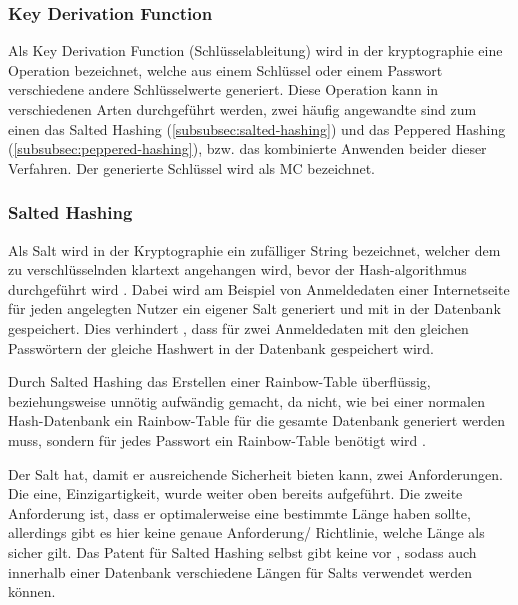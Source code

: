 \subsubsection{Key Derivation Function}\label{subsubsec:key-derivation-function}
Als Key Derivation Function (Schlüsselableitung) wird in der \gls{kryptographie} eine Operation bezeichnet, welche aus einem Schlüssel oder einem Passwort verschiedene andere Schlüsselwerte generiert.\autocite[\vglf][]{NIST:800132} Diese Operation kann in verschiedenen Arten durchgeführt werden, zwei häufig angewandte sind zum einen das Salted Hashing (\autoref{subsubsec:salted-hashing}) und das Peppered Hashing (\autoref{subsubsec:peppered-hashing}), bzw. das kombinierte Anwenden beider dieser Verfahren. Der generierte Schlüssel wird als \ac{MC} bezeichnet.


\subsubsection{Salted Hashing}\label{subsubsec:salted-hashing}
Als Salt wird in der Kryptographie ein zufälliger String bezeichnet, welcher dem zu verschlüsselnden \gls{klartext} angehangen wird, bevor der Hash-\gls{algorithmus} durchgeführt wird \autocite[\vglf][]{JoyOfCryptography:2021}. Dabei wird am Beispiel von Anmeldedaten einer Internetseite für jeden angelegten Nutzer ein eigener Salt generiert und mit in der Datenbank gespeichert.
Dies verhindert \uamol, dass für zwei Anmeldedaten mit den gleichen Passwörtern der gleiche Hashwert in der Datenbank gespeichert wird.

Durch Salted Hashing das Erstellen einer \gls{Rainbow-Table} überflüssig, beziehungsweise unnötig aufwändig gemacht, da nicht, wie bei einer normalen Hash-Datenbank ein \gls{Rainbow-Table} für die gesamte Datenbank generiert werden muss, sondern für jedes Passwort ein \gls{Rainbow-Table} benötigt wird \autocite[\vglf][]{JoyOfCryptography:2021}. 

Der Salt hat, damit er ausreichende Sicherheit bieten kann, zwei Anforderungen. Die eine, Einzigartigkeit, wurde weiter oben bereits aufgeführt. Die zweite Anforderung ist, dass er optimalerweise eine bestimmte Länge haben sollte, allerdings gibt es hier keine genaue Anforderung/ Richtlinie, welche Länge als sicher gilt. Das Patent für Salted Hashing selbst gibt keine vor \autocite[\vglf][]{patent:saltedHashing}, sodass auch innerhalb einer Datenbank verschiedene Längen für Salts verwendet werden können. 

